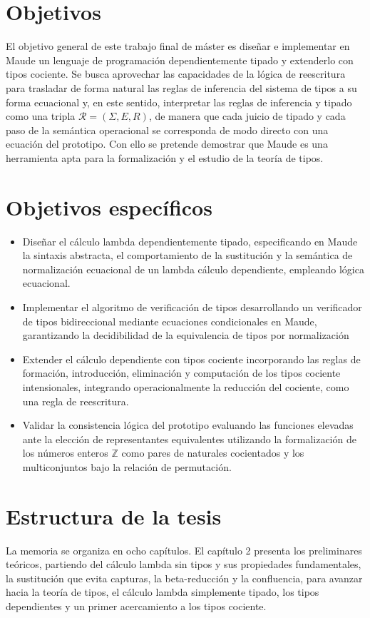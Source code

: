 \section{Objetivos}
El objetivo general de este trabajo final de máster es diseñar e implementar en Maude un lenguaje de programación dependientemente tipado y extenderlo con tipos cociente. Se busca aprovechar las capacidades de la lógica de reescritura para trasladar de forma natural las reglas de inferencia del sistema de tipos a su forma ecuacional y, en este sentido, interpretar las reglas de inferencia y tipado como una tripla $\mathcal{R} = (\Sigma, E, R)$, de manera que cada juicio de tipado y cada paso de la semántica operacional se corresponda de modo directo con una ecuación del prototipo. Con ello se pretende demostrar que Maude es una herramienta apta para la formalización y el estudio de la teoría de tipos.
\section{Objetivos específicos}
\begin{itemize}
  \item Diseñar el cálculo lambda dependientemente tipado, especificando en Maude la sintaxis abstracta, el comportamiento de la sustitución y la semántica de normalización ecuacional de un lambda cálculo dependiente, empleando lógica ecuacional.
  \item Implementar el algoritmo de verificación de tipos desarrollando un verificador de tipos bidireccional mediante ecuaciones condicionales en Maude, garantizando la decidibilidad de la equivalencia de tipos por normalización
  \item Extender el cálculo dependiente con tipos cociente incorporando las reglas de formación, introducción, eliminación y computación de los tipos cociente intensionales, integrando operacionalmente la reducción del cociente, como una regla de reescritura.
  \item Validar la consistencia lógica del prototipo evaluando las funciones elevadas ante la elección de representantes equivalentes utilizando la formalización de los números enteros $\mathbb{Z}$ como pares de naturales cocientados y los multiconjuntos bajo la relación de permutación.
\end{itemize}

\section{Estructura de la tesis}La memoria se organiza en ocho capítulos. El capítulo 2 presenta los preliminares teóricos, partiendo del cálculo lambda sin tipos y sus propiedades fundamentales, la sustitución que evita capturas, la beta-reducción y la confluencia, para avanzar hacia la teoría de tipos, el cálculo lambda simplemente tipado, los tipos dependientes y un primer acercamiento a los tipos cociente.

